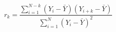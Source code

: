 

\[
r_{k} = \frac{\sum_{i=1}^{N-k}(Y_{i} - \bar{Y})(Y_{i+k} - \bar{Y})} {\sum_{i=1}^{N}(Y_{i} - \bar{Y})^{2} }
\]



